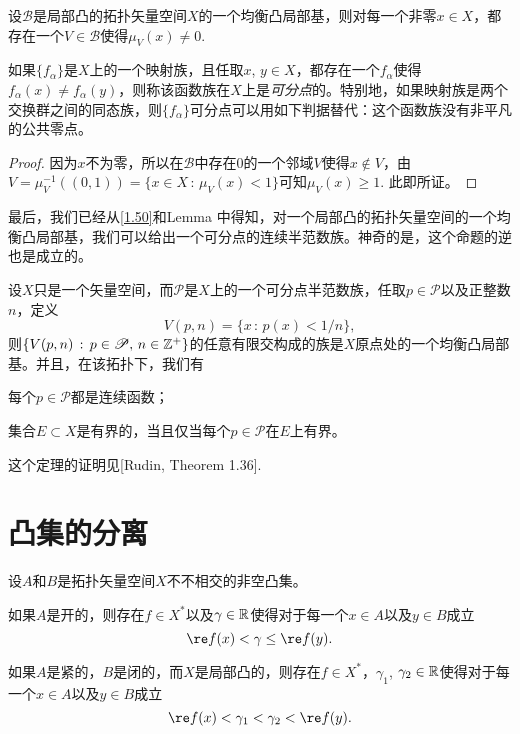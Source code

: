 \begin{lem}
设$\mathscr{B}$是局部凸的拓扑矢量空间$X$的一个均衡凸局部基，则对每一个非零$x\in X$，都存在一个$V\in \mathscr{B}$使得$\mu_V(x)\neq 0$.
\end{lem}

如果$\{f_\alpha\}$是$X$上的一个映射族，且任取$x$, $y\in X$，都存在一个$f_\alpha$使得$f_\alpha(x)\neq f_\alpha(y)$，则称该函数族在$X$上是\textit{可分点}的。特别地，如果映射族是两个交换群之间的同态族，则$\{f_\alpha\}$可分点可以用如下判据替代：这个函数族没有非平凡的公共零点。

\begin{proof}
	因为$x$不为零，所以在$\mathscr{B}$中存在$0$的一个邻域$V$使得$x\not\in V$，由$V=\mu_V^{-1}((0,1))=\{x\in X\,:\, \mu_V(x)<1\}$可知$\mu_V(x)\geq 1$. 此即所证。
\end{proof}

最后，我们已经从\ref{1.50}和Lemma \thelem 中得知，对一个局部凸的拓扑矢量空间的一个均衡凸局部基，我们可以给出一个可分点的连续半范数族。神奇的是，这个命题的逆也是成立的。

\begin{thm}
设$X$只是一个矢量空间，而$\mathscr{P}$是$X$上的一个可分点半范数族，任取$p\in\mathscr{P}$以及正整数$n$，定义
\[
	V(p,n)=\{x\,:\, p(x)<1/n\},
\]
则$\{V(p,n)\,:\, p\in\mathscr{P},\, n\in \mathbb{Z}^+\}$的任意有限交构成的族是$X$原点处的一个均衡凸局部基。并且，在该拓扑下，我们有
\begin{compactenum}[(a)]
\item 每个$p\in \mathscr{P}$都是连续函数；
\item 集合$E\subset X$是有界的，当且仅当每个$p\in \mathscr{P}$在$E$上有界。
\end{compactenum}
\end{thm}

这个定理的证明见[Rudin, Theorem 1.36].

\section{凸集的分离}

\begin{thm}
	设$A$和$B$是拓扑矢量空间$X$不不相交的非空凸集。
	\begin{compactenum}[(a)]
	\item 如果$A$是开的，则存在$f\in X^*$以及$\gamma\in \mathbb{R}$使得对于每一个$x\in A$以及$y\in B$成立
	\[
		\re f(x)<\gamma \leq \re f(y).
	\]
	\item 如果$A$是紧的，$B$是闭的，而$X$是局部凸的，则存在$f\in X^*$，$\gamma_1$, $\gamma_2\in\mathbb{R}$使得对于每一个$x\in A$以及$y\in B$成立
	\[
		\re f(x)<\gamma_1<\gamma_2<\re f(y).
	\]
	\end{compactenum}
\end{thm}

